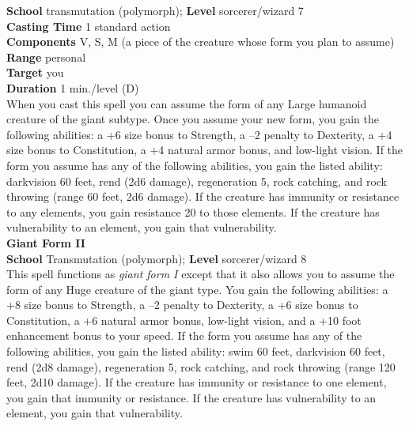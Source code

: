 \textbf{School }transmutation (polymorph); \textbf{Level }sorcerer/wizard 7\\
\textbf{Casting Time }1 standard action\\
\textbf{Components }V, S, M (a piece of the creature whose form you plan to assume)\\
\textbf{Range }personal\\
\textbf{Target }you\\
\textbf{Duration }1 min./level (D)\\
When you cast this spell you can assume the form of any Large humanoid creature of the giant subtype. Once you assume your new form, you gain the following abilities: a +6 size bonus to Strength, a --2 penalty to Dexterity, a +4 size bonus to Constitution, a +4 natural armor bonus, and low-light vision. If the form you assume has any of the following abilities, you gain the listed ability: darkvision 60 feet, rend (2d6 damage), regeneration 5, rock catching, and rock throwing (range 60 feet, 2d6 damage). If the creature has immunity or resistance to any elements, you gain resistance 20 to those elements. If the creature has vulnerability to an element, you gain that vulnerability.\\
\textbf{Giant Form II}\\
\textbf{School }Transmutation (polymorph); \textbf{Level }sorcerer/wizard 8\\
This spell functions as \textit{giant form I }except that it also allows you to assume the form of any Huge creature of the giant type. You gain the following abilities: a +8 size bonus to Strength, a --2 penalty to Dexterity, a +6 size bonus to Constitution, a +6 natural armor bonus, low-light vision, and a +10 foot enhancement bonus to your speed. If the form you assume has any of the following abilities, you gain the listed ability: swim 60 feet, darkvision 60 feet, rend (2d8 damage), regeneration 5, rock catching, and rock throwing (range 120 feet, 2d10 damage). If the creature has immunity or resistance to one element, you gain that immunity or resistance. If the creature has vulnerability to an element, you gain that vulnerability.\\
